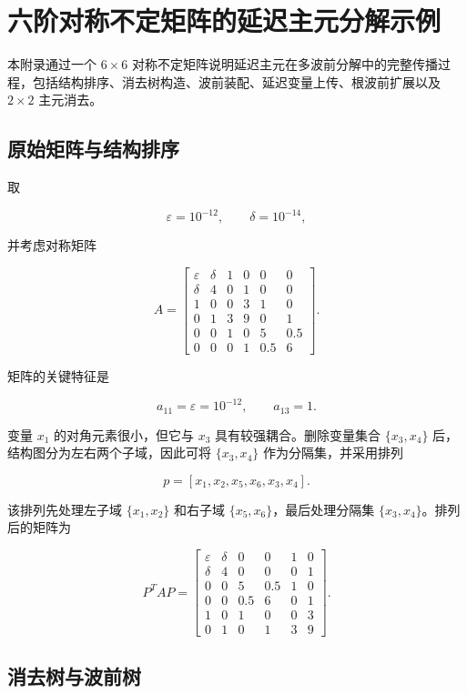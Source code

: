 \chapter{六阶对称不定矩阵的延迟主元分解示例}

本附录通过一个 $6\times6$ 对称不定矩阵说明延迟主元在多波前分解中的完整传播过程，包括结构排序、消去树构造、波前装配、延迟变量上传、根波前扩展以及 $2\times2$ 主元消去。

\section{原始矩阵与结构排序}

取

\[
\varepsilon=10^{-12},
\qquad
\delta=10^{-14},
\]

并考虑对称矩阵

\[
A=
\begin{bmatrix}
\varepsilon&\delta&1&0&0&0\\
\delta&4&0&1&0&0\\
1&0&0&3&1&0\\
0&1&3&9&0&1\\
0&0&1&0&5&0.5\\
0&0&0&1&0.5&6
\end{bmatrix}.
\]

矩阵的关键特征是

\[
a_{11}=\varepsilon=10^{-12},
\qquad
a_{13}=1.
\]

变量 $x_1$ 的对角元素很小，但它与 $x_3$ 具有较强耦合。删除变量集合 $\{x_3,x_4\}$ 后，结构图分为左右两个子域，因此可将 $\{x_3,x_4\}$ 作为分隔集，并采用排列

\[
p=[x_1,x_2,x_5,x_6,x_3,x_4].
\]

该排列先处理左子域 $\{x_1,x_2\}$ 和右子域 $\{x_5,x_6\}$，最后处理分隔集 $\{x_3,x_4\}$。排列后的矩阵为

\[
P^TAP=
\begin{bmatrix}
\varepsilon&\delta&0&0&1&0\\
\delta&4&0&0&0&1\\
0&0&5&0.5&1&0\\
0&0&0.5&6&0&1\\
1&0&1&0&0&3\\
0&1&0&1&3&9
\end{bmatrix}.
\]

\section{消去树与波前树}

